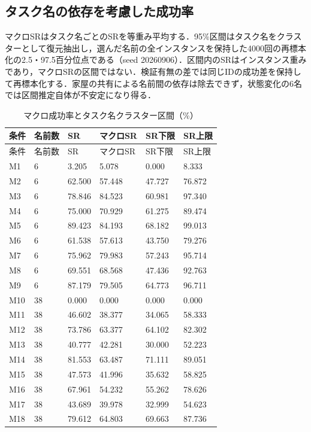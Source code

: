 \subsection{タスク名の依存を考慮した成功率}
マクロSRはタスク名ごとのSRを等重み平均する．95\%区間はタスク名をクラスターとして復元抽出し，選んだ名前の全インスタンスを保持した4000回の再標本化の2.5・97.5百分位点である（seed 20260906）．区間内のSRはインスタンス重みであり，マクロSRの区間ではない．検証有無の差では同じIDの成功差を保持して再標本化する．家屋の共有による名前間の依存は除去できず，状態変化の6名では区間推定自体が不安定になり得る．

{\scriptsize\setlength{\tabcolsep}{3pt}
\begin{longtable}{llllll}
\caption{マクロ成功率とタスク名クラスター区間（\%）}\label{tab:macro_intervals}\\
\hline
条件 & 名前数 & SR & マクロSR & SR下限 & SR上限\\\hline\endfirsthead
条件 & 名前数 & SR & マクロSR & SR下限 & SR上限\\\hline\endhead
\hline\endfoot
M1 & 6 & 3.205 & 5.078 & 0.000 & 8.333 \\
M2 & 6 & 62.500 & 57.448 & 47.727 & 76.872 \\
M3 & 6 & 78.846 & 84.523 & 60.981 & 97.340 \\
M4 & 6 & 75.000 & 70.929 & 61.275 & 89.474 \\
M5 & 6 & 89.423 & 84.193 & 68.182 & 99.013 \\
M6 & 6 & 61.538 & 57.613 & 43.750 & 79.276 \\
M7 & 6 & 75.962 & 79.983 & 57.243 & 95.714 \\
M8 & 6 & 69.551 & 68.568 & 47.436 & 92.763 \\
M9 & 6 & 87.179 & 79.505 & 64.773 & 96.711 \\
M10 & 38 & 0.000 & 0.000 & 0.000 & 0.000 \\
M11 & 38 & 46.602 & 38.377 & 34.065 & 58.333 \\
M12 & 38 & 73.786 & 63.377 & 64.102 & 82.302 \\
M13 & 38 & 40.777 & 42.281 & 30.000 & 52.223 \\
M14 & 38 & 81.553 & 63.487 & 71.111 & 89.051 \\
M15 & 38 & 47.573 & 41.996 & 35.632 & 58.825 \\
M16 & 38 & 67.961 & 54.232 & 55.262 & 78.626 \\
M17 & 38 & 43.689 & 39.978 & 32.999 & 54.623 \\
M18 & 38 & 79.612 & 64.803 & 69.663 & 87.736 \\
\end{longtable}}


